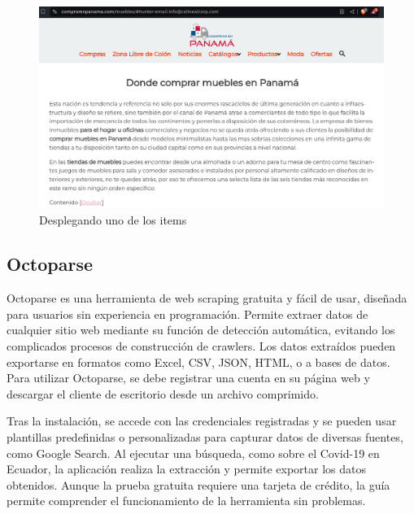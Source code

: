 \documentclass[12pt]{article}
\begin{document}
                        \begin{figure}[!h]
                                \centering
                                \includegraphics[width=1\textwidth]{img/hunter-3.png}
                                \caption{Desplegando uno de los items}
                        \end{figure}
                
                \subsection{Octoparse}
                        Octoparse es una herramienta de web scraping gratuita y fácil de usar, diseñada para usuarios sin experiencia en programación. Permite extraer datos de cualquier sitio web mediante su función de detección automática, evitando los complicados procesos de construcción de crawlers. Los datos extraídos pueden exportarse en formatos como Excel, CSV, JSON, HTML, o a bases de datos. Para utilizar Octoparse, se debe registrar una cuenta en su página web y descargar el cliente de escritorio desde un archivo comprimido. 
                        
                        Tras la instalación, se accede con las credenciales registradas y se pueden usar plantillas predefinidas o personalizadas para capturar datos de diversas fuentes, como Google Search. Al ejecutar una búsqueda, como sobre el Covid-19 en Ecuador, la aplicación realiza la extracción y permite exportar los datos obtenidos. Aunque la prueba gratuita requiere una tarjeta de crédito, la guía permite comprender el funcionamiento de la herramienta sin problemas.
\end{document}
